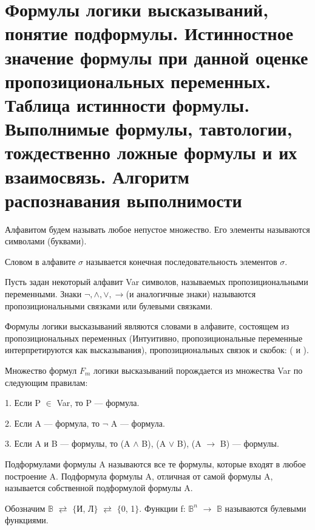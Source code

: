 \section{Формулы логики высказываний, понятие подформулы. Истинностное значение формулы при данной оценке
пропозициональных переменных. Таблица истинности формулы. Выполнимые формулы, тавтологии, тождественно ложные
формулы и их взаимосвязь. Алгоритм распознавания выполнимости}

\begin{definition}
	Алфавитом будем называть любое непустое множество. Его элементы называются символами (буквами).
\end{definition}

\begin{definition}
	Словом в алфавите $\sigma$ называется конечная последовательность элементов $\sigma$.
\end{definition}

Пусть задан некоторый алфавит Var символов, называемых пропозициональными переменными. Знаки $\neg, \land, \lor,
\to$(и аналогичные знаки) называются пропозициональными связками или булевыми связками.

\begin{definition}
	Формулы логики высказываний являются словами в алфавите, состоящем из пропозициональных переменных (Интуитивно,
	пропозициональные переменные интерпретируются как высказывания), пропозициональных связок и скобок: ( и ).
\end{definition}

\begin{definition}
	Множество формул $F_m$ логики высказываний порождается из множества Var по следующим правилам:

	1. Если P $\in$ Var, то P — формула.

	2. Если A — формула, то $\neg$ A — формула.

	3. Если A и B — формулы, то (A $\land$ B), (A $\lor$ B), (A $\to$ B) — формулы.
\end{definition}

\begin{definition}
	Подформулами формулы A называются все те формулы, которые входят в любое построение A. Подформула формулы A,
	отличная от самой формулы A, называется собственной подформулой формулы A.
\end{definition}

\begin{definition}
	Обозначим $\mathbb{B}$ $\rightleftarrows$ $\{$И, Л$\}$ $\rightleftarrows$ $\{$0, 1$\}$. Функции f:
	$\mathbb{B}^n$ $\to$ $\mathbb{B}$ называются булевыми функциями.

\end{definition}

